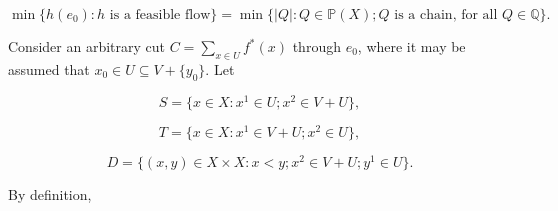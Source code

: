 $$\min\{h(e_0): h \text{ is a feasible flow}\} = \min\{|Q|: Q \in \mathbb{P}(X); Q \text{ is a chain, for all } Q \in \mathbb{Q}\}.$$

Consider an arbitrary cut $C = \sum_{x \in U} f^*(x)$ through $e_0$, where it may be assumed that $x_0 \in U \subseteq V + \{y_0\}$. Let

$$S = \{x \in X: x^1 \in U; x^2 \in V + U\},$$

$$T = \{x \in X: x^1 \in V + U; x^2 \in U\},$$

$$D = \{(x, y) \in X \times X: x < y; x^2 \in V + U; y^1 \in U\}.$$

By definition,
